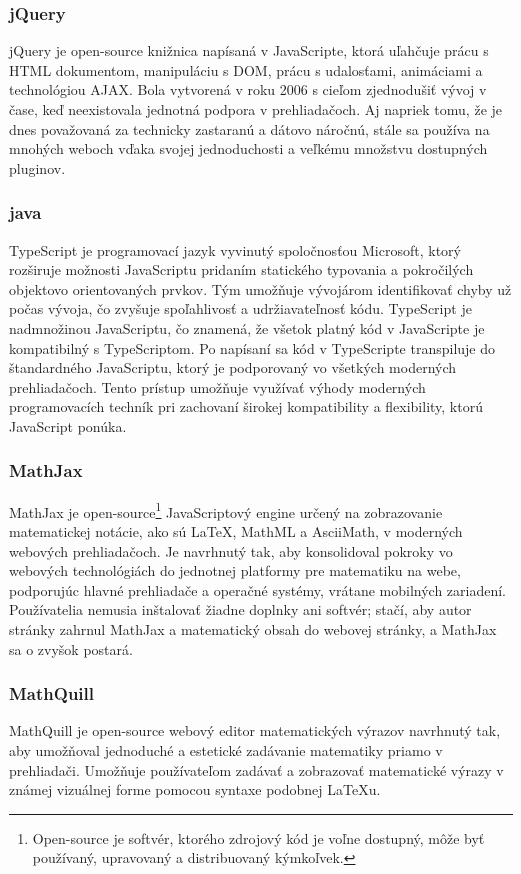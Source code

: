 \subsubsection{jQuery}
jQuery je open-source knižnica napísaná v JavaScripte, ktorá uľahčuje prácu s HTML dokumentom, manipuláciu s DOM, prácu s udalosťami, animáciami a technológiou AJAX.
 Bola vytvorená v roku 2006 s cieľom zjednodušiť vývoj v čase, keď neexistovala jednotná podpora v prehliadačoch.
  Aj napriek tomu, že je dnes považovaná za technicky zastaranú a dátovo náročnú, stále sa používa na mnohých weboch vďaka svojej jednoduchosti a veľkému množstvu dostupných pluginov.\cite{jquery}


 \subsubsection{java}
TypeScript \cite{TypeScript} je programovací jazyk vyvinutý spoločnosťou Microsoft, ktorý rozširuje možnosti JavaScriptu pridaním statického typovania a pokročilých objektovo orientovaných prvkov.
 Tým umožňuje vývojárom identifikovať chyby už počas vývoja, čo zvyšuje spoľahlivosť a udržiavateľnosť kódu.
  TypeScript je nadmnožinou JavaScriptu, čo znamená, že všetok platný kód v JavaScripte je kompatibilný s TypeScriptom.
   Po napísaní sa kód v TypeScripte transpiluje do štandardného JavaScriptu, ktorý je podporovaný vo všetkých moderných prehliadačoch. 
   Tento prístup umožňuje využívať výhody moderných programovacích techník pri zachovaní širokej kompatibility a flexibility, ktorú JavaScript ponúka.
\subsubsection{MathJax}
MathJax \cite{MathJax} je open-source\footnote{Open-source je softvér, ktorého zdrojový kód je voľne dostupný, môže byť používaný, upravovaný a distribuovaný kýmkoľvek.} JavaScriptový engine určený na zobrazovanie matematickej notácie, ako sú LaTeX, MathML a AsciiMath, v moderných webových prehliadačoch.
Je navrhnutý tak, aby konsolidoval pokroky vo webových technológiách do jednotnej platformy pre matematiku na webe, podporujúc hlavné prehliadače a operačné systémy, vrátane mobilných zariadení.
Používatelia nemusia inštalovať žiadne doplnky ani softvér; stačí, aby autor stránky zahrnul MathJax a matematický obsah do webovej stránky, a MathJax sa o zvyšok postará.


  \subsubsection{MathQuill}
  MathQuill \cite{mathquill} je open-source webový editor matematických výrazov navrhnutý tak, aby umožňoval jednoduché a estetické zadávanie matematiky priamo v prehliadači. 
  Umožňuje používateľom zadávať a zobrazovať matematické výrazy v známej vizuálnej forme pomocou syntaxe podobnej LaTeXu.

